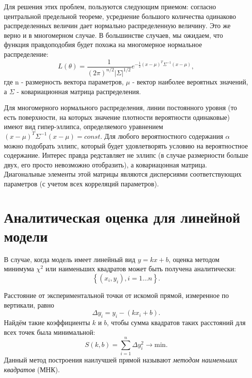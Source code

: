 Для решения этих проблем, пользуются следующим приемом: согласно
центральной предельной теореме, усреднение большого количества одинаково
распределенных величин дает нормально распределенную величину. Это же
верно и в многомерном случае. В большинстве случаев, мы ожидаем, что
функция правдоподобия будет похожа на многомерное нормальное
распределение:
\begin{equation}
    L(\theta) = \frac{1}{(2 \pi)^{n/2}\left|\Sigma\right|^{1/2}} e^{-\frac{1}{2}
(x - \mu)^T \Sigma^{-1} (x - \mu)},
\end{equation}
где n - размерность вектора параметров, $\mu$ - вектор
наиболее вероятных значений, а $\Sigma$ -
%
ковариационная матрица
распределения.

Для многомерного нормального распределения, линии постоянного уровня (то
есть поверхности, на которых значение плотности вероятности одинаковые)
имеют вид гипер-эллипса, определяемого уравнением
$(x - \mu)^T \Sigma^{-1} (x - \mu) = const$. Для любого вероятностного
содержания $\alpha$ можно подобрать эллипс, который будет
удовлетворять условию на вероятностное содержание. Интерес правда
редставляет не эллипс (в случае размерности больше двух, его просто
невозможно отобразить), а ковариацонная матрица. Диагональные элементы
этой матрицы являются дисперсиями соответствующих параметров (с учетом
всех корреляций параметров).


\section{Аналитическая оценка для линейной модели}
\label{sec:linear}

В случае, когда модель имеет линейный вид $y=kx+b$, оценка методом минимума
$\chi^2$ или наименьших квадратов может быть получена аналитически:
\[
\left\{ \left(x_{i},y_{i}\right),i=1\ldots n\right\} .
\]

Расстояние от экспериментальной точки от искомой прямой, измеренное
по вертикали, равно
\[
\Delta y_{i}=y_{i}-\left(kx_{i}+b\right).
\]
Найдём такие коэффициенты $k$ и $b$, чтобы сумма квадратов таких
расстояний для всех точек была минимальной:
\begin{equation}
    S\!\left(k,b\right)=\sum\limits _{i=1}^{n}\Delta
    y_{i}^{2}\to\mathrm{min}.\label{eq:mnk_S}
\end{equation}
Данный метод построения наилучшей прямой называют \emph{методом наименьших
квадратов} (МНК).

